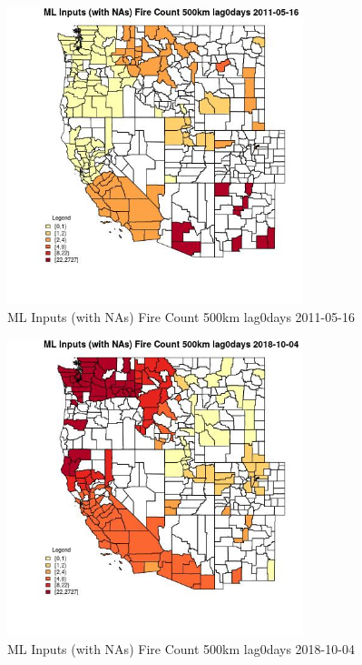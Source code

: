 \begin{figure} 
\centering  
\includegraphics[width=0.77\textwidth]{Code_Outputs/Report_ML_input_PM25_Step4_part_f_de_duplicated_aves_prioritize_24hr_obswNAs_CountyFire_Count_500km_lag0daysMean2011-05-16.jpg} 
\caption{\label{fig:Report_ML_input_PM25_Step4_part_f_de_duplicated_aves_prioritize_24hr_obswNAsCountyFire_Count_500km_lag0daysMean2011-05-16}ML Inputs (with NAs) Fire Count 500km lag0days 2011-05-16} 
\end{figure} 
 

\begin{figure} 
\centering  
\includegraphics[width=0.77\textwidth]{Code_Outputs/Report_ML_input_PM25_Step4_part_f_de_duplicated_aves_prioritize_24hr_obswNAs_CountyFire_Count_500km_lag0daysMean2018-10-04.jpg} 
\caption{\label{fig:Report_ML_input_PM25_Step4_part_f_de_duplicated_aves_prioritize_24hr_obswNAsCountyFire_Count_500km_lag0daysMean2018-10-04}ML Inputs (with NAs) Fire Count 500km lag0days 2018-10-04} 
\end{figure} 
 

